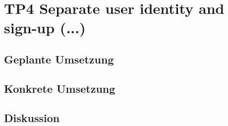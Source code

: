 \section{TP4 Separate user identity and sign-up (...)}
\label{sec:principle-tp4-seperate-user-identity}


\subsection*{Geplante Umsetzung}


\subsection*{Konkrete Umsetzung}


\subsection*{Diskussion}
